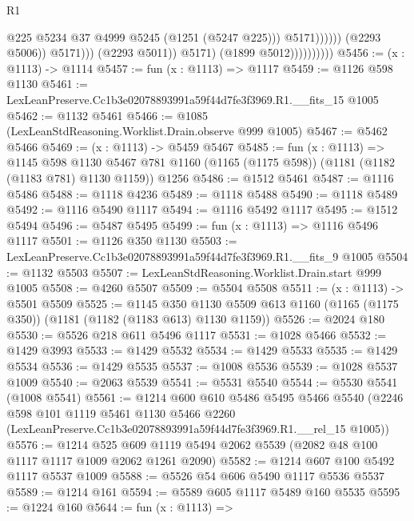 \begin{lexlean}{R1}
\begin{coremodule}
                                                @225
                                                @5234
                                                @37
                                                @4999
                                                @5245
                                                (@1251 (@5247 @225)))
                                              @5171))))))
                                  (@2293 @5006))
                                @5171)))
                          (@2293 @5011))
                        @5171)
                      (@1899 @5012))))))))))
@5456 := (x : @1113) -> @1114
@5457 := fun (x : @1113) => @1117
@5459 := @1126 @598 @1130
@5461 := LexLeanPreserve.Cc1b3e02078893991a59f44d7fe3f3969.R1.__fits_15 @1005
@5462 := @1132 @5461
@5466 := @1085 (LexLeanStdReasoning.Worklist.Drain.observe @999 @1005)
@5467 := @5462 @5466
@5469 := (x : @1113) -> @5459 @5467
@5485 := fun (x : @1113) =>
  @1145
    @598
    @1130
    @5467
    @781
    @1160
    (@1165 (@1175 @598))
    (@1181 (@1182 (@1183 @781) @1130 @1159))
    @1256
@5486 := @1512 @5461
@5487 := @1116 @5486
@5488 := @1118 @4236
@5489 := @1118 @5488
@5490 := @1118 @5489
@5492 := @1116 @5490 @1117
@5494 := @1116 @5492 @1117
@5495 := @1512 @5494
@5496 := @5487 @5495
@5499 := fun (x : @1113) => @1116 @5496 @1117
@5501 := @1126 @350 @1130
@5503 := LexLeanPreserve.Cc1b3e02078893991a59f44d7fe3f3969.R1.__fits_9 @1005
@5504 := @1132 @5503
@5507 := LexLeanStdReasoning.Worklist.Drain.start @999 @1005
@5508 := @4260 @5507
@5509 := @5504 @5508
@5511 := (x : @1113) -> @5501 @5509
@5525 := @1145
    @350
    @1130
    @5509
    @613
    @1160
    (@1165 (@1175 @350))
    (@1181 (@1182 (@1183 @613) @1130 @1159))
@5526 := @2024 @180
@5530 := @5526 @218 @611 @5496 @1117
@5531 := @1028 @5466
@5532 := @1429 @3993
@5533 := @1429 @5532
@5534 := @1429 @5533
@5535 := @1429 @5534
@5536 := @1429 @5535
@5537 := @1008 @5536
@5539 := @1028 @5537 @1009
@5540 := @2063 @5539
@5541 := @5531 @5540
@5544 := @5530 @5541 (@1008 @5541)
@5561 := @1214
    @600
    @610
    @5486
    @5495
    @5466
    @5540
    (@2246
      @598
      @101
      @1119
      @5461
      @1130
      @5466
      @2260
      (LexLeanPreserve.Cc1b3e02078893991a59f44d7fe3f3969.R1.__rel_15 @1005))
@5576 := @1214
    @525
    @609
    @1119
    @5494
    @2062
    @5539
    (@2082 @48 @100 @1117 @1117 @1009 @2062 @1261 @2090)
@5582 := @1214 @607 @100 @5492 @1117 @5537 @1009
@5588 := @5526 @54 @606 @5490 @1117 @5536 @5537
@5589 := @1214 @161
@5594 := @5589 @605 @1117 @5489 @160 @5535
@5595 := @1224 @160
@5644 := fun (x : @1113) =>

\end{coremodule}
\end{lexlean}
